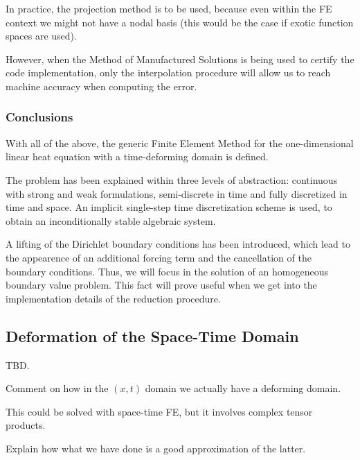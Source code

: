 \documentclass[../main.tex]{subfiles}
\begin{document}
In practice, the projection method is to be used, because even within the FE context we might not have a nodal basis (this would be the case if exotic function spaces are used).

However, when the Method of Manufactured Solutions is being used to certify the code implementation, only the interpolation procedure will allow us to reach machine accuracy when computing the error.

\subsubsection{Conclusions}
With all of the above, the generic Finite Element Method for the one-dimensional linear heat equation with a time-deforming domain is defined.

The problem has been explained within three levels of abstraction: continuous with strong and weak formulations, semi-discrete in time and fully discretized in time and space.
An implicit single-step time discretization scheme is used, to obtain an inconditionally stable algebraic system. 

A lifting of the Dirichlet boundary conditions has been introduced, which lead to the appearence of an additional forcing term and the cancellation of the boundary conditions.
Thus, we will focus in the solution of an homogeneous boundary value problem.
This fact will prove useful when we get into the implementation details of the reduction procedure.

\subsection{Deformation of the Space-Time Domain}
TBD.

Comment on how in the $(x,t)$ domain we actually have a deforming domain. 

This could be solved with space-time FE, but it involves complex tensor products. 

Explain how what we have done is a good approximation of the latter.


\newpage
\end{document}
